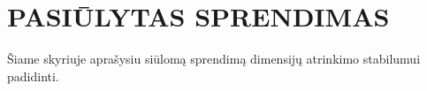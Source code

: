 \section{PASIŪLYTAS SPRENDIMAS}
\label{pasiulytas_sprendimas}

Šiame skyriuje aprašysiu siūlomą sprendimą dimensijų atrinkimo stabilumui padidinti.